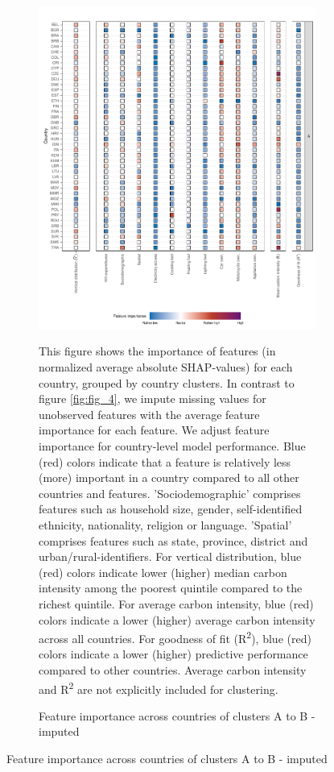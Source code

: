 \clearpage
\begin{figure}[ht!]\ContinuedFloat
    \centering
    \begin{subfigure}[b]{\textwidth}
    \centering
    \includegraphics{Figure 4/Figure_4_Corrected_Imputed_1.pdf}
    \caption{Feature importance across countries of clusters A to B - imputed}\label{fig:fig_4_1_imputed}\label{fig:fig_4_imputed}
    \begin{subcaption2}
    This figure shows the importance of features (in normalized average absolute SHAP-values) for each country, grouped by country clusters. In contrast to figure \ref{fig:fig_4}, we impute missing values for unobserved features with the average feature importance for each feature. We adjust feature importance for country-level model performance. Blue (red) colors indicate that a feature is relatively less (more) important in a country compared to all other countries and features. 'Sociodemographic' comprises features such as household size, gender, self-identified ethnicity, nationality, religion or language. 'Spatial' comprises features such as state, province, district and urban/rural-identifiers. For vertical distribution, blue (red) colors indicate lower (higher) median carbon intensity among the poorest quintile compared to the richest quintile. For average carbon intensity, blue (red) colors indicate a lower (higher) average carbon intensity across all countries. For goodness of fit (R\textsuperscript{2}), blue (red) colors indicate a lower (higher) predictive performance compared to other countries. Average carbon intensity and R\textsuperscript{2} are not explicitly included for clustering.

\end{subcaption2}
\end{subfigure}
\end{figure}
